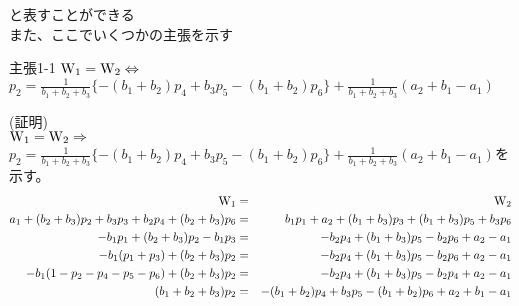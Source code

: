 \documentclass[11pt]{jarticle} %
\begin{document}
\begin{flushleft}
  と表すことができる\\
  また、ここでいくつかの主張を示す
\end{flushleft}

\begin{itembox}[l]{主張1-1}
${\rm W_{1}} = {\rm W_{2}}\Leftrightarrow $
$p_2 = \frac{1}{b_1+b_2+b_3}\{-(b_1+b_2)p_4+b_3p_5-(b_1+b_2)p_6\}+\frac{1}{b_1+b_2+b_3}(a_2+b_1-a_1)$
\end{itembox}

(証明)\\
${\rm W_{1}}={\rm W_{2}}\Rightarrow $
$p_2=\frac{1}{b_1+b_2+b_3}\{-(b_1+b_2)p_4+b_3p_5-(b_1+b_2)p_6\}+\frac{1}{b_1+b_2+b_3}(a_2+b_1-a_1)$を示す。
\begin{eqnarray*}
{\rm W_{1}}&=&{\rm W_{2}}\\
a_1+(b_2+b_3)p_2+b_3p_3+b_2p_4+(b_2+b_3)p_6&=&b_1p_1+a_2+(b_1+b_3)p_3+(b_1+b_3)p_5+b_3p_6\\
-b_1p_1+(b_2+b_3)p_2-b_1p_3&=&-b_2p_4+(b_1+b_3)p_5-b_2p_6+a_2-a_1\\
-b_1(p_1+p_3)+(b_2+b_3)p_2&=&-b_2p_4+(b_1+b_3)p_5-b_2p_6+a_2-a_1\\
-b_1(1-p_2-p_4-p_5-p_6)+(b_2+b_3)p_2&=&-b_2p_4+(b_1+b_3)p_5-b_2p_4+a_2-a_1\\
(b_1+b_2+b_3)p_2&=&-(b_1+b_2)p_4+b_3p_5-(b_1+b_2)p_6+a_2+b_1-a_1
\end{eqnarray*}\\
\end{document}
